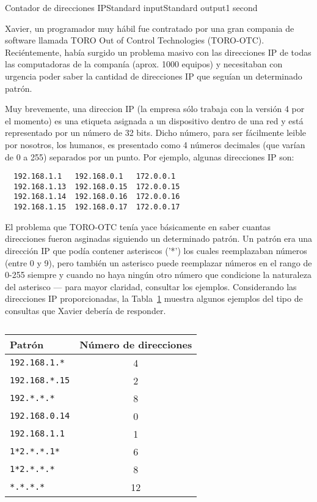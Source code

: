 \begin{problem}{Contador de direcciones IP}{Standard input}{Standard output}{1 second}{}


Xavier, un programador muy h\'abil fue contratado por una gran compania de software llamada TORO Out of Control Technologies (TORO-OTC). Reci\'entemente, hab\'ia surgido un problema masivo con las direcciones IP de todas las computadoras de la compan\'ia (aprox. 1000 equipos) y necesitaban con urgencia poder saber la cantidad de direcciones IP que segu\'ian un determinado patr\'on.

Muy brevemente, una direccion IP (la empresa s\'olo trabaja con la versi\'on 4 por el momento)  es una etiqueta asignada a un dispositivo dentro de una red y est\'a representado por un n\'umero de 32 bits. Dicho n\'umero, para ser f\'acilmente leible por nosotros, los humanos, es presentado como 4 n\'umeros decimales (que var\'ian de 0 a 255) separados por un punto. Por ejemplo, algunas direcciones IP son:

\begin{verbatim}
  192.168.1.1   192.168.0.1   172.0.0.1
  192.168.1.13  192.168.0.15  172.0.0.15
  192.168.1.14  192.168.0.16  172.0.0.16
  192.168.1.15  192.168.0.17  172.0.0.17
\end{verbatim}

El problema que TORO-OTC ten\'ia yace b\'asicamente en saber cuantas direcciones fueron asginadas siguiendo un determinado patr\'on. Un patr\'on era una direcci\'on IP que pod\'ia contener asteriscos ('*') los cuales reemplazaban n\'umeros (entre 0 y 9), pero tambi\'en un asterisco puede reemplazar n\'umeros en el rango de 0-255 siempre y cuando no haya ning\'un otro n\'umero que condicione la naturaleza del asterisco --- para mayor claridad, consultar los ejemplos. Considerando las direcciones IP proporcionadas, la Tabla~\ref{tab:ip} muestra algunos ejemplos del tipo de consultas que Xavier deber\'ia de responder.

\begin{table}[h]
\centering
\caption{}
\label{tab:ip}
\begin{tabular}{|l|c|}
\hline
Patrón        & Número de direcciones \\
\hline
\texttt{192.168.1.* }  & 4 \\
\texttt{192.168.*.15}  & 2 \\
\texttt{192.*.*.*   }  & 8 \\
\texttt{192.168.0.14}  & 0 \\
\texttt{192.168.1.1 }  & 1 \\
\texttt{1*2.*.*.1* }   & 6 \\
\texttt{1*2.*.*.*}     & 8 \\
\texttt{*.*.*.*}       & 12 \\ 
\hline
\end{tabular}
\end{table}



\end{problem}
